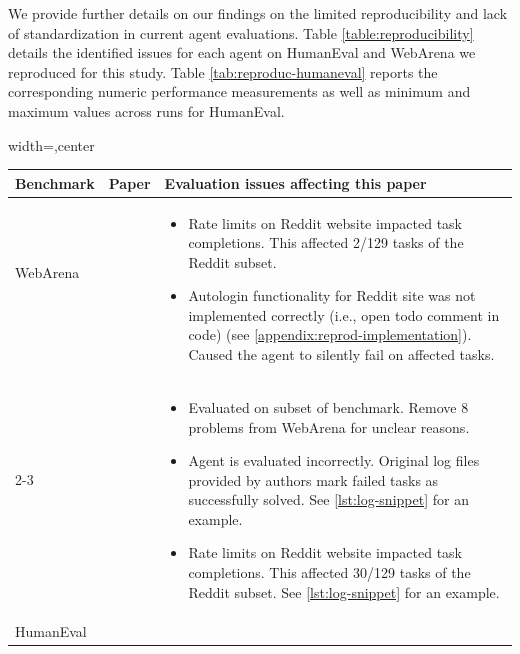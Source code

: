 \documentclass{article}
\begin{document}
We provide further details on our findings on the limited reproducibility and lack of standardization in current agent evaluations. Table \ref{table:reproducibility} details the identified issues for each agent on HumanEval and WebArena we reproduced for this study. Table \ref{tab:reproduc-humaneval} reports the corresponding numeric performance measurements as well as minimum and maximum values across runs for HumanEval.


\begin{table}[h!]
  \centering
  \footnotesize
  \begin{adjustbox}{width=\textwidth,center}
\begin{tabular}{p{1.3cm}p{2.4cm}p{7cm}}
{\textbf{Benchmark}}&{\textbf{Paper}}&\textbf{Evaluation issues affecting this paper}
\\ 
\midrule
WebArena&\citet{zhou_webarena_2024}&\multirow{2}{7cm}{\vspace{-.4cm}\begin{itemize}[leftmargin=*]
    \item Rate limits on Reddit website impacted task completions. This affected 2/129 tasks of the Reddit subset.
    \item Autologin functionality for Reddit site was not implemented correctly (i.e., open todo comment in code) (see \cref{appendix:reprod-implementation}). Caused the agent to silently fail on affected tasks.
\end{itemize}}
\\ [.7cm]
&&
\\[1.4cm]
\cmidrule(rl){2-3} 
&\citet{sodhi_step_2024}&
\multirow{2}{7cm}{\vspace{-.4cm}\begin{itemize}[leftmargin=*]
    \item Evaluated on subset of benchmark. Remove 8 problems from WebArena for unclear reasons.
    \item Agent is evaluated incorrectly. Original log files provided by authors mark failed tasks as successfully solved. See \cref{lst:log-snippet} for an example.
    \item Rate limits on Reddit website impacted task completions. This affected 30/129 tasks of the Reddit subset. See \cref{lst:log-snippet} for an example.
\end{itemize}}
\\[.1cm]
&&
\\[2.5cm]
\midrule
HumanEval&\citet{zhou_language_2023}&
\multirow{2}{7cm}{\vspace{-.4cm}\begin{itemize}[leftmargin=*]

\end{itemize}}
\end{tabular}
\end{adjustbox}
\end{table}
\end{document}
